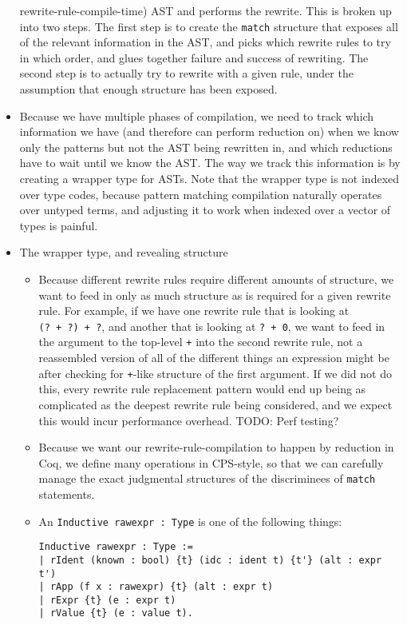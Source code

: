 \begin{itemize}
  rewrite-rule-compile-time) AST and performs the rewrite. This is
  broken up into two steps. The first step is to create the
  \texttt{match} structure that exposes all of the relevant information
  in the AST, and picks which rewrite rules to try in which order, and
  glues together failure and success of rewriting. The second step is to
  actually try to rewrite with a given rule, under the assumption that
  enough structure has been exposed.
\item
  Because we have multiple phases of compilation, we need to track which
  information we have (and therefore can perform reduction on) when we
  know only the patterns but not the AST being rewritten in, and which
  reductions have to wait until we know the AST. The way we track this
  information is by creating a wrapper type for ASTs. Note that the
  wrapper type is not indexed over type codes, because pattern matching
  compilation naturally operates over untyped terms, and adjusting it to
  work when indexed over a vector of types is painful.
\item
  The wrapper type, and revealing structure

  \begin{itemize}
  \item
    Because different rewrite rules require different amounts of
    structure, we want to feed in only as much structure as is required
    for a given rewrite rule. For example, if we have one rewrite rule
    that is looking at \texttt{(?\ +\ ?)\ +\ ?}, and another that is
    looking at \texttt{?\ +\ 0}, we want to feed in the argument to the
    top-level \texttt{+} into the second rewrite rule, not a reassembled
    version of all of the different things an expression might be after
    checking for \texttt{+}-like structure of the first argument. If we
    did not do this, every rewrite rule replacement pattern would end up
    being as complicated as the deepest rewrite rule being considered,
    and we expect this would incur performance overhead. TODO: Perf
    testing?
  \item
    Because we want our rewrite-rule-compilation to happen by reduction
    in Coq, we define many operations in CPS-style, so that we can
    carefully manage the exact judgmental structures of the discriminees
    of \texttt{match} statements.
  \item
    An \texttt{Inductive\ rawexpr\ :\ Type} is one of the following
    things:

\begin{verbatim}
Inductive rawexpr : Type :=
| rIdent (known : bool) {t} (idc : ident t) {t'} (alt : expr t')
| rApp (f x : rawexpr) {t} (alt : expr t)
| rExpr {t} (e : expr t)
| rValue {t} (e : value t).
\end{verbatim}


\end{itemize}
\end{itemize}
